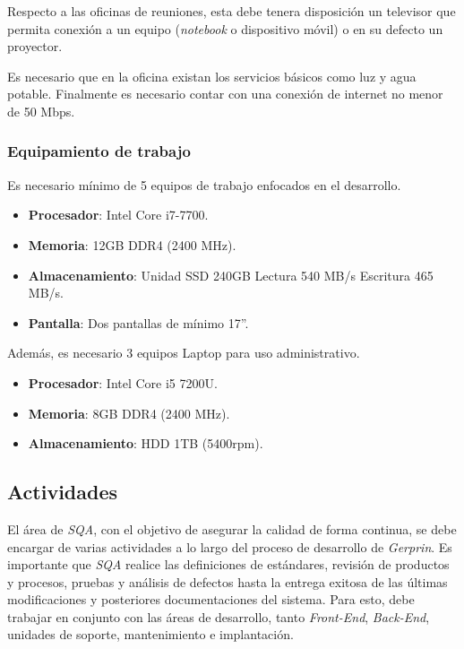 Respecto a las oficinas de reuniones, esta debe tenera disposición un televisor que permita conexión a un equipo (\textit{notebook} o dispositivo móvil) o en su defecto un proyector.

Es necesario que en la oficina existan los servicios básicos como luz y agua potable. Finalmente es necesario contar con una conexión de internet no menor de 50 Mbps.

\subsubsection{Equipamiento de trabajo}

Es necesario mínimo de 5 equipos de trabajo enfocados en el desarrollo.

	\begin{itemize}
		\item 
		\textbf{Procesador}: Intel Core i7-7700.
		\item 
		\textbf{Memoria}: 12GB DDR4 (2400 MHz).
		\item 
		\textbf{Almacenamiento}: Unidad SSD 240GB Lectura 540 MB/s Escritura 465 MB/s.
		\item 
		\textbf{Pantalla}: Dos pantallas de mínimo 17”.
	\end{itemize}

Además, es necesario  3 equipos Laptop para uso administrativo. 

	\begin{itemize}
		\item 
		\textbf{Procesador}: Intel Core i5 7200U.
		\item 
		\textbf{Memoria}: 8GB DDR4 (2400 MHz).
		\item 
		\textbf{Almacenamiento}: HDD 1TB (5400rpm).
	\end{itemize}

\subsection{Actividades}

El área de \textit{SQA}, con el objetivo de asegurar la calidad de forma continua, se debe encargar de varias actividades a lo largo del proceso de desarrollo de \textit{Gerprin}. Es importante que \textit{SQA} realice las definiciones de estándares, revisión de productos y procesos, pruebas y análisis de defectos hasta la entrega exitosa de las últimas modificaciones y posteriores documentaciones del sistema. Para esto, debe trabajar en conjunto con las áreas de desarrollo, tanto \textit{Front-End}, \textit{Back-End}, unidades de soporte, mantenimiento e implantación.

